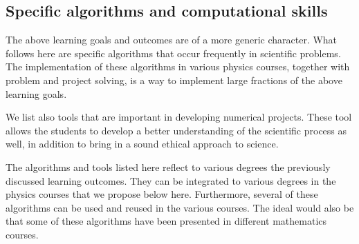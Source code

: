 \documentclass[%
oneside,                 %
final,                   %
10pt]{article}
\begin{document}
\noindent
\subsection*{Specific algorithms and computational skills}

The above learning goals and outcomes are of a more generic character. What follows here are specific 
algorithms that occur frequently in scientific problems. The implementation of these algorithms in various physics courses, together with problem and project solving, is a way to implement large fractions of the above learning goals. 

We list also tools that are important in developing
numerical projects. These tool allows the students to develop a better understanding of the scientific process as well, in addition to bring in a sound ethical approach to science.

The algorithms and tools listed here reflect to various degrees the previously discussed learning outcomes. They can be integrated to various degrees in the physics courses that we propose below here. Furthermore, several of these algorithms can be used and reused in the various courses. The ideal would also be that some of these algorithms have been presented in different mathematics courses.
\end{document}
